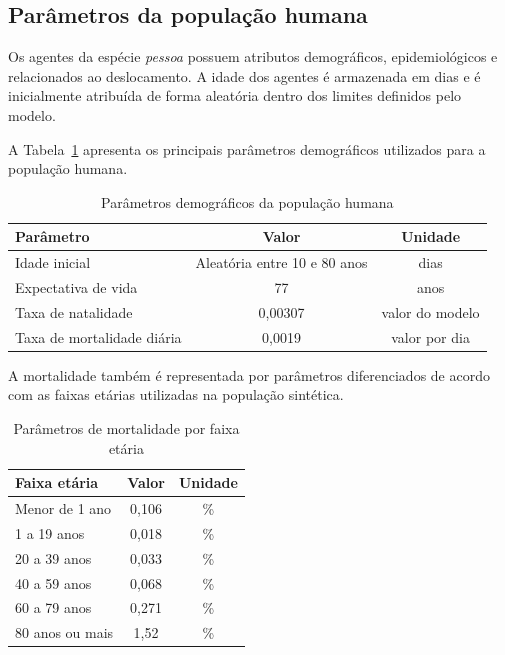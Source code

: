 \subsection{Parâmetros da população humana}

Os agentes da espécie \textit{pessoa} possuem atributos demográficos, epidemiológicos e relacionados ao deslocamento. A idade dos agentes é armazenada em dias e é inicialmente atribuída de forma aleatória dentro dos limites definidos pelo modelo.

A Tabela~\ref{tab:parametros-demograficos} apresenta os principais parâmetros demográficos utilizados para a população humana.

\begin{table}[htb]
    \centering
    \caption{Parâmetros demográficos da população humana}
    \label{tab:parametros-demograficos}
    \begin{tabular}{l c c}
        \hline
        \textbf{Parâmetro} & \textbf{Valor} & \textbf{Unidade} \\
        \hline
        Idade inicial & Aleatória entre 10 e 80 anos & dias \\
        Expectativa de vida & 77 & anos \\
        Taxa de natalidade & 0,00307 & valor do modelo \\
        Taxa de mortalidade diária & 0,0019 & valor por dia \\
        \hline
    \end{tabular}
\end{table}

A mortalidade também é representada por parâmetros diferenciados de acordo com as faixas etárias utilizadas na população sintética.

\begin{table}[htb]
    \centering
    \caption{Parâmetros de mortalidade por faixa etária}
    \label{tab:mortalidade-faixa-etaria}
    \begin{tabular}{l c c}
        \hline
        \textbf{Faixa etária} & \textbf{Valor} & \textbf{Unidade} \\
        \hline
        Menor de 1 ano & 0,106 & \% \\
        1 a 19 anos & 0,018 & \% \\
        20 a 39 anos & 0,033 & \% \\
        40 a 59 anos & 0,068 & \% \\
        60 a 79 anos & 0,271 & \% \\
        80 anos ou mais & 1,52 & \% \\
        \hline
    \end{tabular}
\end{table}

